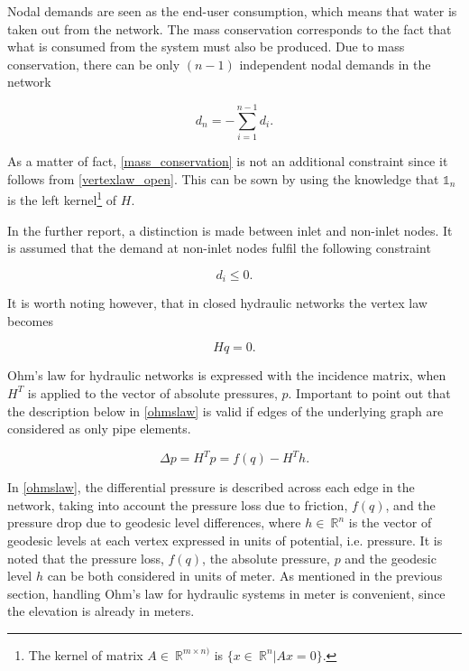 Nodal demands are seen as the end-user consumption, which means that water is taken out from the network. The mass conservation corresponds to the fact that what is consumed from the system must also be produced. Due to mass conservation, there can be only $(n-1)$ independent nodal demands in the network

\begin{equation}
  \label{mass_conservation}
  d_n = - \sum_{i=1}^{n-1} d_i.
\end{equation}

As a matter of fact, \eqref{mass_conservation} is not an additional constraint since it follows from \eqref{vertexlaw_open}. This can be sown by using the knowledge that $\mathds{1}_n$ is the left kernel\footnote{The kernel of matrix $A \in \: \mathbb{R}^{m \times n)}$ is $ \{x \in \: \mathbb{R}^{n} | Ax = 0 \} $.} of $H$.

In the further report, a distinction is made between inlet and non-inlet nodes. It is assumed that the demand at non-inlet nodes fulfil the following constraint

\begin{equation}
  \label{non_inlet_constraint}
  d_i \leq 0.
\end{equation}

It is worth noting however, that in closed hydraulic networks the vertex law becomes

\begin{equation}
  \label{vertexlaw_closed}
  Hq = 0.
\end{equation}

Ohm's law for hydraulic networks is expressed with the incidence matrix, when $H^T$ is applied to the vector of absolute pressures, $p$. Important to point out that the description below in \eqref{ohmslaw} is valid if edges of the underlying graph are considered as only pipe elements.

\begin{equation}
  \label{ohmslaw}
  \Delta p = H^Tp = f(q) - H^Th.
\end{equation}

In \eqref{ohmslaw}, the differential pressure is described across each edge in the network, taking into account the pressure loss due to friction, $f(q)$, and the pressure drop due to geodesic level differences,  where $h \in \: \mathbb{R}^{n}$ is the vector of geodesic levels at each vertex expressed in units of potential, i.e. pressure. It is noted that the pressure loss, $f(q)$, the absolute pressure, $p$  and the geodesic level $h$ can be both considered in units of meter. As mentioned in the previous section, handling Ohm's law for hydraulic systems in meter is convenient, since the elevation is already in meters.


